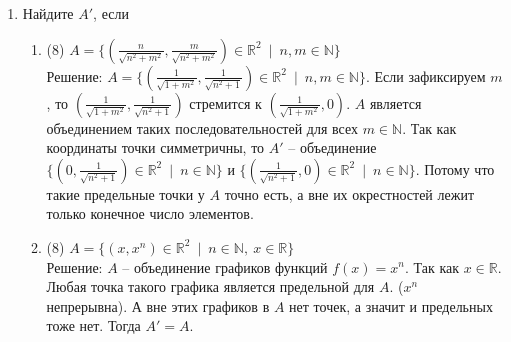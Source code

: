 \documentclass[a4paper]{article}
\begin{document}
\begin{enumerate}
	\item Найдите $A'$, если
    \begin{enumerate}
        \item (8) $A = \{\left(\frac{n}{\sqrt{n^2+m^2}},\frac{m}{\sqrt{n^2+m^2}}\right)\in \mathbb R^2\ \mid\ n,m\in \mathbb N\}$\\
        Решение: $A = \{\left(\frac{1}{\sqrt{1+m^2}},\frac{1}{\sqrt{n^2+1}}\right)\in \mathbb R^2\ \mid\ n,m\in \mathbb N\}$. Если зафиксируем $m$, то $\left(\frac{1}{\sqrt{1+m^2}},\frac{1}{\sqrt{n^2+1}}\right)$ стремится к $\left(\frac{1}{\sqrt{1+m^2}},0\right)$. $A$ является объединением таких последовательностей для всех $m \in \mathbb N$. Так как координаты точки симметричны, то $A'$ -- объединение $\{\left(0,\frac{1}{\sqrt{n^2+1}}\right)\in \mathbb R^2\ \mid\ n \in \mathbb N\}$ и $\{\left(\frac{1}{\sqrt{n^2+1}},0\right)\in \mathbb R^2\ \mid\ n \in \mathbb N\}$. Потому что такие предельные точки у $A$ точно есть, а вне их окрестностей лежит только конечное число элементов.
        \item (8) $A = \{(x,x^n)\in \mathbb R^2\ \mid\ n\in \mathbb N,\ x\in \mathbb R\}$\\
        Решение: $A$ -- объединение графиков функций $f(x) = x^n$. Так как $x \in \mathbb R$. Любая точка такого графика является предельной для $A$. ($x^n$ непрерывна). А вне этих графиков в $A$ нет точек, а значит и предельных тоже нет. Тогда $A' = A$.  
    \end{enumerate}
	

\end{enumerate}
\end{document}
